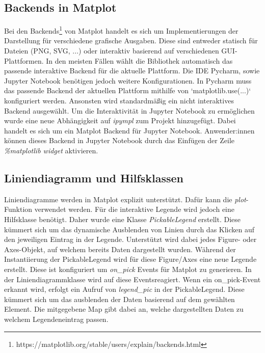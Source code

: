 \subsection{Backends in Matplot}
\label{subsec:impl_backend}
\noindent Bei den Backends\footnote{https://matplotlib.org/stable/users/explain/backends.html} von Matplot handelt es sich um Implementierungen der Darstellung für verschiedene grafische Ausgaben. Diese sind entweder statisch für Dateien (PNG, SVG, ...) oder interaktiv basierend auf verschiedenen GUI-Plattformen. In den meisten Fällen wählt die Bibliothek automatisch das passende interaktive Backend für die aktuelle Plattform. Die IDE Pycharm, sowie Jupyter Notebook benötigen jedoch weitere Konfigurationen. In Pycharm muss das passende Backend der aktuellen Plattform mithilfe von `matplotlib.use(...)` konfiguriert werden. Ansonsten wird standardmäßig ein nicht interaktives Backend ausgewählt. Um die Interaktivität in Jupyter Notebook zu ermöglichen wurde eine neue Abhängigkeit auf \emph{ipympl} zum Projekt hinzugefügt. Dabei handelt es sich um ein Matplot Backend für Jupyter Notebook. Anwender:innen können dieses Backend in Jupyter Notebook durch das Einfügen der Zeile \emph{\%matplotlib widget} aktivieren. 

\subsection{Liniendiagramm und Hilfsklassen}
\label{subsec:impl_linien_helper}
\noindent Liniendiagramme werden in Matplot explizit unterstützt. Dafür kann die \emph{plot}-Funktion verwendet werden. Für die interaktive Legende wird jedoch eine Hilfsklasse benötigt. Daher wurde eine Klasse \emph{PickableLegend} erstellt. Diese kümmert sich um das dynamische Ausblenden von Linien durch das Klicken auf den jeweiligen Eintrag in der Legende. Unterstützt wird dabei jedes Figure- oder Axes-Objekt, auf welchem bereits Daten dargestellt wurden. Während der Instantiierung der PickableLegend wird für diese Figure/Axes eine neue Legende erstellt. Diese ist konfiguriert um \emph{on\_pick} Events für Matplot zu generieren. In der Liniendiagrammklasse wird auf diese Events\linebreak reagiert. Wenn ein on\_pick-Event erkannt wird, erfolgt ein Aufruf von \emph{legend\_pic} in der PickableLegend. Diese kümmert sich um das ausblenden der Daten basierend auf dem gewählten Element. Die mitgegebene Map gibt dabei an, welche dargestellten Daten zu welchem Legendeneintrag passen.

